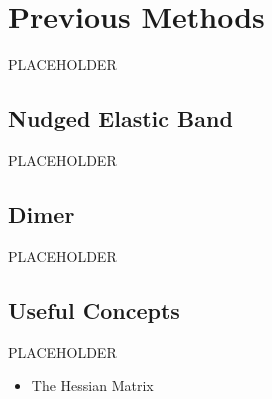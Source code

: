\section{Previous Methods}
PLACEHOLDER
\subsection{Nudged Elastic Band}
PLACEHOLDER
\subsection{Dimer}
PLACEHOLDER
\subsection{Useful Concepts}
PLACEHOLDER
\begin{itemize}
\item The Hessian Matrix
\end{itemize}

